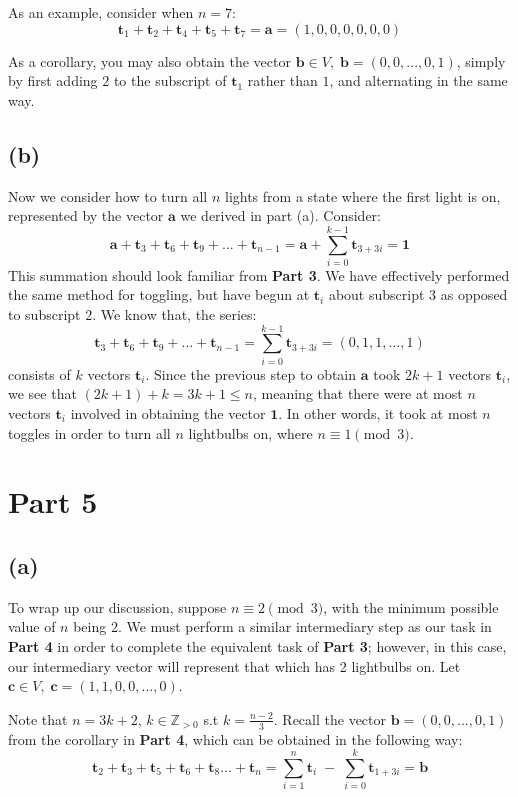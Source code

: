 \documentclass[12pt, letterpaper]{article}
\newcommand{\Z}{\mathbb{Z}}
\newcommand{\0}{\textbf{0}}
\newcommand{\1}{\textbf{1}}
\renewcommand{\t}{\textbf{t}}
\renewcommand{\a}{\textbf{a}}
\renewcommand{\b}{\textbf{b}}
\renewcommand{\c}{\textbf{c}}
\begin{document}
As an example, consider when $n =7$: $$\t_1 + \t_2 + \t_4 + \t_5 + \t_7 = \a = (1, 0, 0, 0, 0, 0, 0)$$

As a corollary, you may also obtain the vector $\b \in V, \; \b = (0, 0, ..., 0, 1)$, simply by first adding $2$ to the subscript of $\t_1$ rather than $1$, and alternating in the same way.

\subsection*{(b)}

Now we consider how to turn all $n$ lights from a state where the first light is on, represented by the vector $\a$ we derived in part (a). Consider: 
$$ \a + \t_3 + \t_6 + \t_9 + ... + \t_{n-1} = \a +  \sum_{i=0}^{k-1} \t_{3+3i} = \1$$
This summation should look familiar from \textbf{Part 3}. We have effectively performed the same method for toggling, but have begun at $\t_i$ about subscript $3$ as opposed to subscript $2$. We know that, the series: $$ \t_3 + \t_6 + \t_9 + ... + \t_{n-1} =  \sum_{i=0}^{k-1} \t_{3+3i} = (0, 1, 1, ..., 1)$$ consists of $k$ vectors $\t_i$. Since the previous step to obtain $\a$ took $2k+1$ vectors $\t_i$, we see that $(2k+1) + k = 3k + 1 \le n$, meaning that there were at most $n$ vectors $\t_i$ involved in obtaining the vector $\1$. In other words, it took at most $n$ toggles in order to turn all $n$ lightbulbs on, where $n \equiv 1\pmod{3}$.

\section*{Part 5}

\subsection*{(a)}

To wrap up our discussion, suppose $n \equiv 2\pmod{3}$, with the minimum possible value of $n$ being $2$. We must perform a similar intermediary step as our task in \textbf{Part 4} in order to complete the equivalent task of \textbf{Part 3}; however, in this case, our intermediary vector will represent that which has 2 lightbulbs on. Let $\c \in V, \; \c = (1, 1, 0, 0, ..., 0)$.

Note that $n = 3k+2$, $k \in \Z_{> 0}$ s.t $k = \frac{n-2}{3}$. Recall the vector $\b = (0,0,...,0,1)$ from the corollary in \textbf{Part 4}, which can be obtained in the following way:
$$\t_2 + \t_3 + \t_5 + \t_6 + \t_8 ... + \t_n = \sum_{i=1}^{n} \t_i \; - \; \sum_{i=0}^{k} \t_{1+3i} = \b$$
\end{document}
